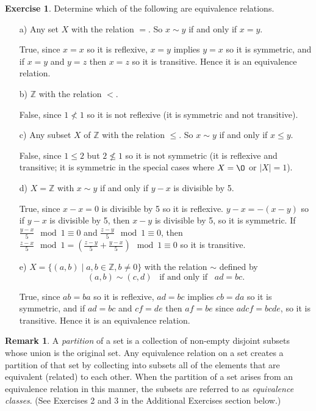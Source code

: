 \documentclass[11pt]{article}
\renewcommand{\emptyset}{\O}
\renewcommand{\_}[1]{\underline{ #1 }}
\theoremstyle{definition}
\newtheorem{exercise}[theorem]{Exercise}
\newtheorem{remark}[theorem]{Remark}
\numberwithin{equation}{subsection}
\begin{document}
\begin{exercise}\label{equivclassex}
Determine which of the following are equivalence relations.
\begin{enumerate}
\item[a)] Any set $X$ with the relation $=.$ So $x\sim y$ if and only if $x=y.$

True, since $x=x$ so it is reflexive, $x =y$ implies $y=x$ so it is symmetric, and if $x=y$ and $y=z$ then $x=z$ so it is transitive. Hence it is an equivalence relation.
\item[b)] $\mathbb{Z}$ with the relation $<.$ 

False, since $1 \not < 1$ so it is not reflexive (it is symmetric and not transitive).
\item[c)] Any subset $X $ of $\mathbb{Z}$ with the relation $\leq.$ So $x\sim y$ if and only if $x\leq y.$ 

False, since $1 \leq 2$ but $2 \not \leq 1$ so it is not symmetric (it is reflexive and transitive; it is symmetric in the special cases where $X = \emptyset$ or $|X|=1$).
\item[d)] $X=\mathbb{Z}$ with $x\sim y$ if and only if $y-x$ is divisible by 5.

True, since $x-x=0$ is divisible by 5 so it is reflexive. $y-x = -(x-y)$ so if $y-x$ is divisible by 5, then $x-y$ is divisible by 5, so it is symmetric. If $\frac{y-x}{5} \mod 1 \equiv 0$ and $\frac{z-y}{5} \mod 1 \equiv 0$, then $\frac{z-x}{5} \mod 1 = (\frac{z-y}{5} + \frac{y-x}{5}) \mod 1 \equiv 0$ so it is transitive.

\item[e)]  $X=\{(a,b)\mid a,b\in \mathbb{Z}, b\neq 0\}$ with the relation $\sim$ defined by
$$(a,b)\sim (c,d)\hspace{10pt}\mbox{if and only if}\hspace{10pt}ad=bc.$$

True, since $ab=ba$ so it is reflexive, $ad=bc$ implies $cb=da$ so it is symmetric, and if $ad=bc$ and $cf=de$ then $af=be$ since $adcf=bcde$, so it is transitive. Hence it is an equivalence relation.


 \end{enumerate}
 \end{exercise}


\begin{remark}  
A {\em partition} of a set is a collection of non-empty
disjoint subsets whose union is the original set.  
Any equivalence relation on a set creates a partition of that set by collecting into subsets all
of the elements that are equivalent (related) to each other.
When the partition of a set arises from an equivalence relation in this manner, the subsets
are referred to as {\em equivalence classes}. (See Exercises 2 and 3 in the Additional Exercises section below.)
\end{remark}  
\end{document}
